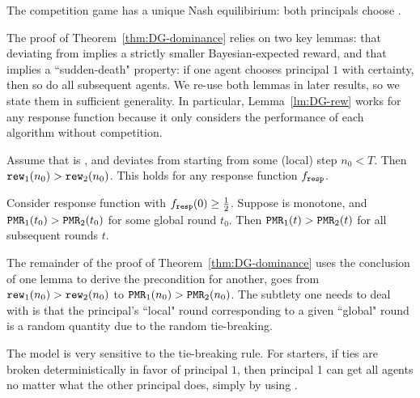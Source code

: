 \begin{corollary}\label{cor:DG-dominance}
The competition game has a unique Nash equilibirium: both principals choose \DynGreedy. 
\end{corollary}

The proof of Theorem~\ref{thm:DG-dominance} relies on two key lemmas: that deviating from \DynGreedy implies a strictly smaller Bayesian-expected reward, and that \HardMax implies a ``sudden-death" property: if one agent chooses principal $1$ with certainty, then so do all subsequent agents. We re-use both lemmas in later results, so we state them in sufficient generality. In particular, Lemma~\ref{lm:DG-rew} works for any response function because it only considers the performance of each algorithm without competition.


\begin{lemma}\label{lm:DG-rew}
Assume that \alg[1] is \DynGreedy, and \alg[2] deviates from \DynGreedy starting from some (local) step $n_0<T$. Then $\mathtt{rew}_1(n_0)>\mathtt{rew}_2(n_0)$. This holds for any response function $f_{\mathtt{resp}}$.
\end{lemma}


\begin{lemma}\label{lm:DG-sudden}
Consider \HardMax response function with $f_{\mathtt{resp}}(0)\geq\tfrac12$.
Suppose \alg[1] is monotone, and $\mathtt{PMR}_1(t_0)>\mathtt{PMR}_2(t_0)$ for some global round $t_0$. Then $\mathtt{PMR}_1(t)>\mathtt{PMR}_2(t)$ for all subsequent rounds $t$.
\end{lemma}

The remainder of the proof of Theorem~\ref{thm:DG-dominance} uses the conclusion of one lemma to derive the precondition for another, \ie goes from $\mathtt{rew}_1(n_0)>\mathtt{rew}_2(n_0)$ to $\mathtt{PMR}_1(n_0)>\mathtt{PMR}_2(n_0)$. The subtlety one needs to deal with is that the principal's ``local" round corresponding to a given ``global" round is a random quantity due to the random tie-breaking.


The \HardMax model is very sensitive to the tie-breaking rule. For starters, if ties are  broken deterministically in favor of principal $1$, then principal 1 can get all agents no matter what the other principal does, simply by using \StaticGreedy.

